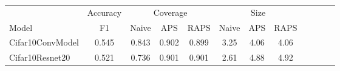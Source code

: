 \begin{table}[t] 
\centering 
\small 
\begin{tabular}{lccccccccccc} 
\toprule 
  & \multicolumn{1}{c}{Accuracy}  & \multicolumn{3}{c}{Coverage} & \multicolumn{3}{c}{Size}  \\ 
\cmidrule(r){2-2}  \cmidrule(r){3-5}  \cmidrule(r){6-8}  
Model & F1 & Naive & APS & RAPS & Naive & APS & RAPS  \\ 
\midrule 
 Cifar10ConvModel &  0.545 & 0.843 & 0.902 & 0.899 & 3.25 & 4.06 & 4.06 \\ 
 Cifar10Resnet20 &  0.521 & 0.736 & 0.901 & 0.901 & 2.61 & 4.88 & 4.92 \\ 
\bottomrule 
\end{tabular} 
\end{table} 
